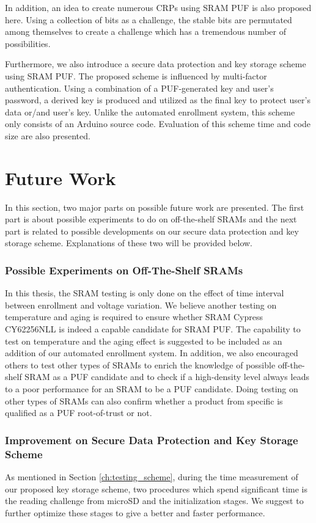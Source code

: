 In addition, an idea to create numerous CRPs using SRAM PUF is also proposed here. Using a collection of bits as a challenge, the stable bits are permutated among themselves to create a challenge which has a tremendous number of possibilities.

Furthermore, we also introduce a secure data protection and key storage scheme using SRAM PUF. The proposed scheme is influenced by multi-factor authentication. Using a combination of a PUF-generated key and user's password, a derived key is produced and utilized as the final key to protect user's data or/and user's key. Unlike the automated enrollment system, this scheme only consists of an Arduino source code. Evaluation of this scheme time and code size are also presented.


\section{Future Work}

In this section, two major parts on possible future work are presented. The first part is about possible experiments to do on off-the-shelf SRAMs and the next part is related to possible developments on our secure data protection and key storage scheme. Explanations of these two will be provided below.

\subsubsection{Possible Experiments on Off-The-Shelf SRAMs}
In this thesis, the SRAM testing is only done on the effect of time interval between enrollment and voltage variation. We believe another testing on temperature and aging is required to ensure whether SRAM Cypress CY62256NLL is indeed a capable candidate for SRAM PUF. The capability to test on temperature and the aging effect is suggested to be included as an addition of our automated enrollment system.
In addition, we also encouraged others to test other types of SRAMs to enrich the knowledge of possible off-the-shelf SRAM as a PUF candidate and to check if a high-density level always leads to a poor performance for an SRAM to be a PUF candidate. Doing testing on other types of SRAMs can also confirm whether a product from specific is qualified as a PUF root-of-trust or not.


\subsubsection{Improvement on Secure Data Protection and Key Storage Scheme}
As mentioned in Section \ref{ch:testing_scheme}, during the time measurement of our proposed key storage scheme, two procedures which spend significant time is the reading challenge from microSD and the initialization stages. We suggest to further optimize these stages to give a better and faster performance.

